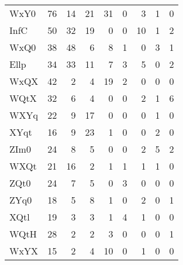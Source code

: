 \begin{table}[htbp!]
\begin{adjustbox}{width=1\textwidth}
\begin{tabular}{lrrrrrrrr}
WxY0        &            76 &          14 &            21 &         31 &              0 &         3 &             1 &              0 \\
InfC        &            50 &          32 &            19 &          0 &              0 &        10 &             1 &              2 \\
WxQ0        &            38 &          48 &             6 &          8 &              1 &         0 &             3 &              1 \\
Ellp        &            34 &          33 &            11 &          7 &              3 &         5 &             0 &              2 \\
WxQX        &            42 &           2 &             4 &         19 &              2 &         0 &             0 &              0 \\
WQtX        &            32 &           6 &             4 &          0 &              0 &         2 &             1 &              6 \\
WXYq        &            22 &           9 &            17 &          0 &              0 &         0 &             1 &              0 \\
XYqt        &            16 &           9 &            23 &          1 &              0 &         0 &             2 &              0 \\
ZIm0        &            24 &           8 &             5 &          0 &              0 &         2 &             5 &              2 \\
WXQt        &            21 &          16 &             2 &          1 &              1 &         1 &             1 &              0 \\
ZQt0        &            24 &           7 &             5 &          0 &              3 &         0 &             0 &              0 \\
ZYq0        &            18 &           5 &             8 &          1 &              0 &         2 &             0 &              1 \\
XQtl        &            19 &           3 &             3 &          1 &              4 &         1 &             0 &              0 \\
WQtH        &            28 &           2 &             2 &          3 &              0 &         0 &             0 &              1 \\
WxYX        &            15 &           2 &             4 &         10 &              0 &         1 &             0 &              0 \\

\end{tabular}
\end{adjustbox}
\end{table}
